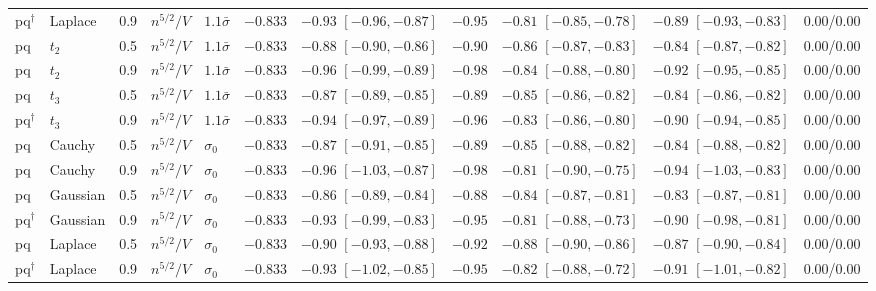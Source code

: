 \begin{longtable}{lllllcccccc}
pq$^\dagger$ & Laplace & 0.9 & $n^{5/2}/V$ & $1.1\bar\sigma$ & $-0.833$ & $-0.93$ {\scriptsize $[-0.96, -0.87]$} & $-0.95$ & $-0.81$ {\scriptsize $[-0.85, -0.78]$} & $-0.89$ {\scriptsize $[-0.93, -0.83]$} & 0.00/0.00 \\
pq & $t_2$ & 0.5 & $n^{5/2}/V$ & $1.1\bar\sigma$ & $-0.833$ & $-0.88$ {\scriptsize $[-0.90, -0.86]$} & $-0.90$ & $-0.86$ {\scriptsize $[-0.87, -0.83]$} & $-0.84$ {\scriptsize $[-0.87, -0.82]$} & 0.00/0.00 \\
pq & $t_2$ & 0.9 & $n^{5/2}/V$ & $1.1\bar\sigma$ & $-0.833$ & $-0.96$ {\scriptsize $[-0.99, -0.89]$} & $-0.98$ & $-0.84$ {\scriptsize $[-0.88, -0.80]$} & $-0.92$ {\scriptsize $[-0.95, -0.85]$} & 0.00/0.00 \\
pq & $t_3$ & 0.5 & $n^{5/2}/V$ & $1.1\bar\sigma$ & $-0.833$ & $-0.87$ {\scriptsize $[-0.89, -0.85]$} & $-0.89$ & $-0.85$ {\scriptsize $[-0.86, -0.82]$} & $-0.84$ {\scriptsize $[-0.86, -0.82]$} & 0.00/0.00 \\
pq$^\dagger$ & $t_3$ & 0.9 & $n^{5/2}/V$ & $1.1\bar\sigma$ & $-0.833$ & $-0.94$ {\scriptsize $[-0.97, -0.89]$} & $-0.96$ & $-0.83$ {\scriptsize $[-0.86, -0.80]$} & $-0.90$ {\scriptsize $[-0.94, -0.85]$} & 0.00/0.00 \\
pq & Cauchy & 0.5 & $n^{5/2}/V$ & $\sigma_0$ & $-0.833$ & $-0.87$ {\scriptsize $[-0.91, -0.85]$} & $-0.89$ & $-0.85$ {\scriptsize $[-0.88, -0.82]$} & $-0.84$ {\scriptsize $[-0.88, -0.82]$} & 0.00/0.00 \\
pq & Cauchy & 0.9 & $n^{5/2}/V$ & $\sigma_0$ & $-0.833$ & $-0.96$ {\scriptsize $[-1.03, -0.87]$} & $-0.98$ & $-0.81$ {\scriptsize $[-0.90, -0.75]$} & $-0.94$ {\scriptsize $[-1.03, -0.83]$} & 0.00/0.00 \\
pq & Gaussian & 0.5 & $n^{5/2}/V$ & $\sigma_0$ & $-0.833$ & $-0.86$ {\scriptsize $[-0.89, -0.84]$} & $-0.88$ & $-0.84$ {\scriptsize $[-0.87, -0.81]$} & $-0.83$ {\scriptsize $[-0.87, -0.81]$} & 0.00/0.00 \\
pq$^\dagger$ & Gaussian & 0.9 & $n^{5/2}/V$ & $\sigma_0$ & $-0.833$ & $-0.93$ {\scriptsize $[-0.99, -0.83]$} & $-0.95$ & $-0.81$ {\scriptsize $[-0.88, -0.73]$} & $-0.90$ {\scriptsize $[-0.98, -0.81]$} & 0.00/0.00 \\
pq & Laplace & 0.5 & $n^{5/2}/V$ & $\sigma_0$ & $-0.833$ & $-0.90$ {\scriptsize $[-0.93, -0.88]$} & $-0.92$ & $-0.88$ {\scriptsize $[-0.90, -0.86]$} & $-0.87$ {\scriptsize $[-0.90, -0.84]$} & 0.00/0.00 \\
pq$^\dagger$ & Laplace & 0.9 & $n^{5/2}/V$ & $\sigma_0$ & $-0.833$ & $-0.93$ {\scriptsize $[-1.02, -0.85]$} & $-0.95$ & $-0.82$ {\scriptsize $[-0.88, -0.72]$} & $-0.91$ {\scriptsize $[-1.01, -0.82]$} & 0.00/0.00 \\

\end{longtable}
